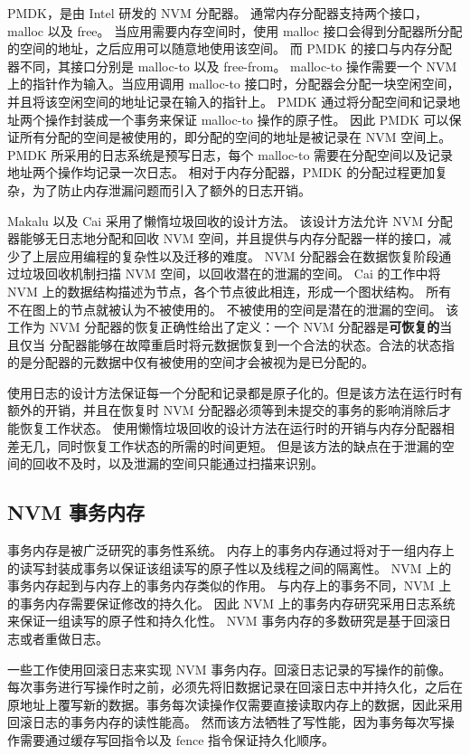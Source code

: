 PMDK，是由 Intel 研发的 NVM 分配器\cite{pmdk}。
通常内存分配器支持两个接口，malloc 以及 free。
当应用需要内存空间时，使用 malloc 接口会得到分配器所分配的空间的地址，之后应用可以随意地使用该空间。
而 PMDK 的接口与内存分配器不同，其接口分别是 malloc-to 以及 free-from。
malloc-to 操作需要一个 NVM 上的指针作为输入。当应用调用 malloc-to 接口时，分配器会分配一块空闲空间，并且将该空闲空间的地址记录在输入的指针上。
PMDK 通过将分配空间和记录地址两个操作封装成一个事务来保证 malloc-to 操作的原子性。
因此 PMDK 可以保证所有分配的空间是被使用的，即分配的空间的地址是被记录在 NVM 空间上。
PMDK 所采用的日志系统是预写日志，每个 malloc-to 需要在分配空间以及记录地址两个操作均记录一次日志。
相对于内存分配器，PMDK 的分配过程更加复杂，为了防止内存泄漏问题而引入了额外的日志开销。

Makalu\cite{bhandari_makalu_2016} 以及 Cai\cite{cai_understanding_2020} 采用了懒惰垃圾回收的设计方法。
该设计方法允许 NVM 分配器能够无日志地分配和回收 NVM 空间，并且提供与内存分配器一样的接口，减少了上层应用编程的复杂性以及迁移的难度。
NVM 分配器会在数据恢复阶段通过垃圾回收机制扫描 NVM 空间，以回收潜在的泄漏的空间。
Cai 的工作中将 NVM 上的数据结构描述为节点，各个节点彼此相连，形成一个图状结构。
所有不在图上的节点就被认为不被使用的。
不被使用的空间是潜在的泄漏的空间。
该工作为 NVM 分配器的恢复正确性给出了定义：一个 NVM 分配器是\textbf{可恢复的}当且仅当
分配器能够在故障重启时将元数据恢复到一个合法的状态。合法的状态指的是分配器的元数据中仅有被使用的空间才会被视为是已分配的。

使用日志的设计方法保证每一个分配和记录都是原子化的。但是该方法在运行时有额外的开销，并且在恢复时 NVM 分配器必须等到未提交的事务的影响消除后才能恢复工作状态。
使用懒惰垃圾回收的设计方法在运行时的开销与内存分配器相差无几，同时恢复工作状态的所需的时间更短。
但是该方法的缺点在于泄漏的空间的回收不及时，以及泄漏的空间只能通过扫描来识别。



\subsection{NVM 事务内存}

事务内存是被广泛研究的事务性系统。
内存上的事务内存通过将对于一组内存上的读写封装成事务以保证该组读写的原子性以及线程之间的隔离性。
NVM 上的事务内存起到与内存上的事务内存类似的作用。
与内存上的事务不同，NVM 上的事务内存需要保证修改的持久化。
因此 NVM 上的事务内存研究采用日志系统来保证一组读写的原子性和持久化性。
NVM 事务内存的多数研究是基于回滚日志或者重做日志。

一些工作使用回滚日志来实现 NVM 事务内存\cite{coburn_nv-heaps_2011, kolli_high-performance_2016}。回滚日志记录的写操作的前像。每次事务进行写操作时之前，必须先将旧数据记录在回滚日志中并持久化，之后在原地址上覆写新的数据。事务每次读操作仅需要直接读取内存上的数据，因此采用回滚日志的事务内存的读性能高。
然而该方法牺牲了写性能，因为事务每次写操作需要通过缓存写回指令以及 fence 指令保证持久化顺序。


